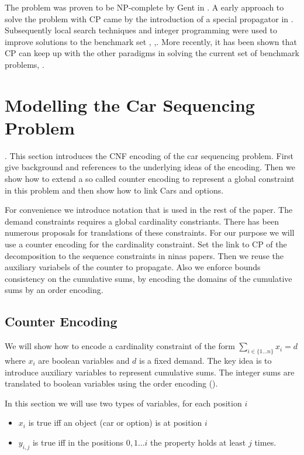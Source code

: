 \documentclass[]{llncs}
\newcommand{\todo}[1]{ {\color{red}{#1} }}
\begin{document}
The problem was proven to be NP-complete by Gent in \cite{Gent98}. A early approach to solve the problem with CP came by
the introduction of a special propagator in \cite{Regin97}.  Subsequently local search techniques and integer
programming were used to improve solutions to the benchmark set \cite{Gottlieb03}, \cite{Estellon06},\cite{Gravel05}.
More recently, it has been shown that CP can keep up with the other paradigms in solving the current set of benchmark
problems, \cite{Siala12}. 

\section{Modelling the Car Sequencing Problem}

\todo{5}. 
This section introduces the CNF encoding of the car sequencing problem. First give background and references to the
underlying ideas of the encoding. Then we show how to extend a so called counter encoding to represent a global
constraint in this problem and then show how to link Cars and options. 

For convenience we introduce notation that is used in the rest of the paper. 
The demand constraints requires a global cardinality constriants. There has been numerous proposals for translations of
these constraints. For our purpose we will use a counter encoding for the cardinality constraint. 
Set the link to CP of the decomposition to the sequence constraints in ninas papers. Then we reuse the
auxiliary variabels of the counter to propagate. Also we enforce bounds consistency on the cumulative sums, by encoding
the domains of the cumulative sums by an order encoding. 

\subsection{Counter Encoding}

We will show how to encode a cardinality constraint of the form $ \sum_{i\in \{1\ldots n\}} x_{i} = d $ where $x_i$ are
boolean variables and $d$ is a fixed demand. The key idea is to introduce auxiliary variables to represent cumulative
sums. The integer sums are translated to boolean variables using the order encoding (\cite{Tamura09}). 

In this section we will use two types of variables, for each position $i$ 

\begin{itemize}
    \item  $x_i$ is true iff an object (car or option) is at position $i$
    \item  $y_{i,j}$ is true iff in the positions $0,1 \ldots i$ the property holds at least $j$ times. 
\end{itemize} 
\end{document}
